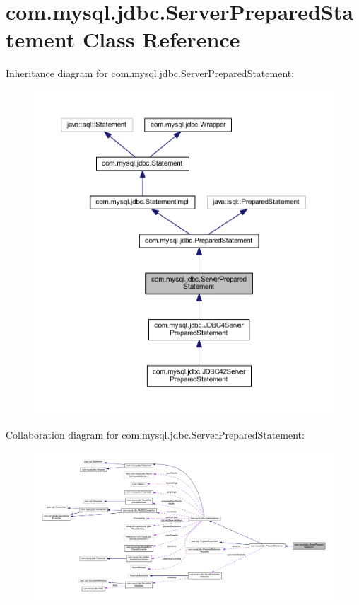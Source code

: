 \hypertarget{classcom_1_1mysql_1_1jdbc_1_1_server_prepared_statement}{}\section{com.\+mysql.\+jdbc.\+Server\+Prepared\+Statement Class Reference}
\label{classcom_1_1mysql_1_1jdbc_1_1_server_prepared_statement}


Inheritance diagram for com.\+mysql.\+jdbc.\+Server\+Prepared\+Statement\+:
\nopagebreak
\begin{figure}[H]
\begin{center}
\leavevmode
\includegraphics[width=350pt]{classcom_1_1mysql_1_1jdbc_1_1_server_prepared_statement__inherit__graph}
\end{center}
\end{figure}


Collaboration diagram for com.\+mysql.\+jdbc.\+Server\+Prepared\+Statement\+:
\nopagebreak
\begin{figure}[H]
\begin{center}
\leavevmode
\includegraphics[width=350pt]{classcom_1_1mysql_1_1jdbc_1_1_server_prepared_statement__coll__graph}
\end{center}
\end{figure}
